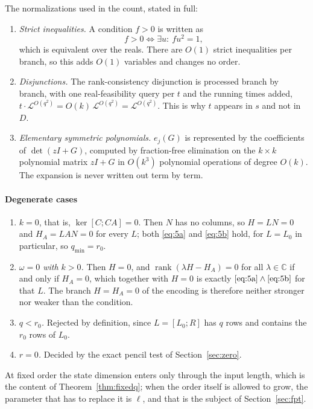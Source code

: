 \documentclass[journal]{IEEEtran}
\theoremstyle{plainn}
\theoremstyle{remark}
\begin{document}
The normalizations used in the count, stated in full:

\begin{enumerate}
\item \emph{Strict inequalities.} A condition $f>0$ is written as
\begin{equation*}
f>0\iff\exists u:\ fu^2=1,
\end{equation*}
which is equivalent over the reals. There are $O(1)$ strict inequalities per
branch, so this adds $O(1)$ variables and changes no order.
\item \emph{Disjunctions.} The rank-consistency disjunction is processed branch
by branch, with one real-feasibility query per $t$ and the running times
added, $t\cdot\mathcal L^{O(q^2)}=O(k)\,\mathcal L^{O(q^2)}=\mathcal L^{O(q^2)}$.
This is why $t$ appears in $s$ and not in $D$.
\item \emph{Elementary symmetric polynomials.} $e_j(G)$ is represented by the
coefficients of $\det(zI+G)$, computed by fraction-free elimination on the
$k\times k$ polynomial matrix $zI+G$ in $O(k^3)$ polynomial operations of
degree $O(k)$. The expansion is never written out term by term.
\end{enumerate}

\paragraph*{Degenerate cases}\label{sec:deg}

\begin{enumerate}
\item \emph{$k=0$}, that is, $\ker[C;CA]=0$. Then $N$ has no columns, so $H=LN=0$ and
$H_A=LAN=0$ for every $L$; both \eqref{eq:5a} and \eqref{eq:5b} hold, for $L=L_0$ in particular, so
$q_{\min}=r_0$.
\item \emph{$\omega=0$ with $k>0$.} Then $H=0$, and
$\operatorname{rank}(\lambda H-H_A)=0$ for all $\lambda\in\mathbb C$ if and only if $H_A=0$,
which together with $H=0$ is exactly $\eqref{eq:5a}\wedge\eqref{eq:5b}$ for
that $L$. The branch $H=H_A=0$ of the encoding is therefore neither stronger
nor weaker than the condition.
\item \emph{$q<r_0$.} Rejected by definition, since $L=[L_0;R]$ has $q$ rows
and contains the $r_0$ rows of $L_0$.
\item \emph{$r=0$.} Decided by the exact pencil test of Section~\ref{sec:zero}.
\end{enumerate}

At fixed order the state dimension enters only through the input length, which is the content of
Theorem~\ref{thm:fixedq}; when the order itself is allowed to grow, the parameter that has to replace it
is $\ell$, and that is the subject of Section~\ref{sec:fpt}.
\end{document}
